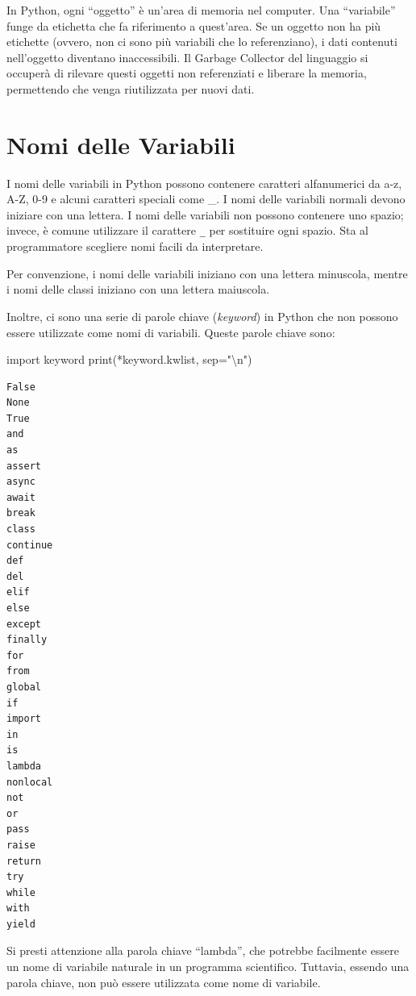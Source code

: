\documentclass[
  letterpaper,
  krantz2]{{[}./krantz{]}}
\newenvironment{Shaded}{\begin{snugshade}}{\end{snugshade}}
\newcommand{\BuiltInTok}[1]{\textcolor[rgb]{0.00,0.23,0.31}{#1}}
\newcommand{\CharTok}[1]{\textcolor[rgb]{0.13,0.47,0.30}{#1}}
\newcommand{\ImportTok}[1]{\textcolor[rgb]{0.00,0.46,0.62}{#1}}
\newcommand{\NormalTok}[1]{\textcolor[rgb]{0.00,0.23,0.31}{#1}}
\newcommand{\OperatorTok}[1]{\textcolor[rgb]{0.37,0.37,0.37}{#1}}
\newcommand{\StringTok}[1]{\textcolor[rgb]{0.13,0.47,0.30}{#1}}
\begin{document}
In Python, ogni ``oggetto'' è un'area di memoria nel computer. Una
``variabile'' funge da etichetta che fa riferimento a quest'area. Se un
oggetto non ha più etichette (ovvero, non ci sono più variabili che lo
referenziano), i dati contenuti nell'oggetto diventano inaccessibili. Il
Garbage Collector del linguaggio si occuperà di rilevare questi oggetti
non referenziati e liberare la memoria, permettendo che venga
riutilizzata per nuovi dati.

\section{Nomi delle Variabili}\label{nomi-delle-variabili}

I nomi delle variabili in Python possono contenere caratteri
alfanumerici da a-z, A-Z, 0-9 e alcuni caratteri speciali come \_. I
nomi delle variabili normali devono iniziare con una lettera. I nomi
delle variabili non possono contenere uno spazio; invece, è comune
utilizzare il carattere \texttt{\_} per sostituire ogni spazio. Sta al
programmatore scegliere nomi facili da interpretare.

Per convenzione, i nomi delle variabili iniziano con una lettera
minuscola, mentre i nomi delle classi iniziano con una lettera
maiuscola.

Inoltre, ci sono una serie di parole chiave (\emph{keyword}) in Python
che non possono essere utilizzate come nomi di variabili. Queste parole
chiave sono:

\begin{Shaded}
\begin{Highlighting}[]
\ImportTok{import}\NormalTok{ keyword}
\BuiltInTok{print}\NormalTok{(}\OperatorTok{*}\NormalTok{keyword.kwlist, sep}\OperatorTok{=}\StringTok{"}\CharTok{\textbackslash{}n}\StringTok{"}\NormalTok{)}
\end{Highlighting}
\end{Shaded}

\begin{verbatim}
False
None
True
and
as
assert
async
await
break
class
continue
def
del
elif
else
except
finally
for
from
global
if
import
in
is
lambda
nonlocal
not
or
pass
raise
return
try
while
with
yield
\end{verbatim}

Si presti attenzione alla parola chiave ``lambda'', che potrebbe
facilmente essere un nome di variabile naturale in un programma
scientifico. Tuttavia, essendo una parola chiave, non può essere
utilizzata come nome di variabile.
\end{document}
